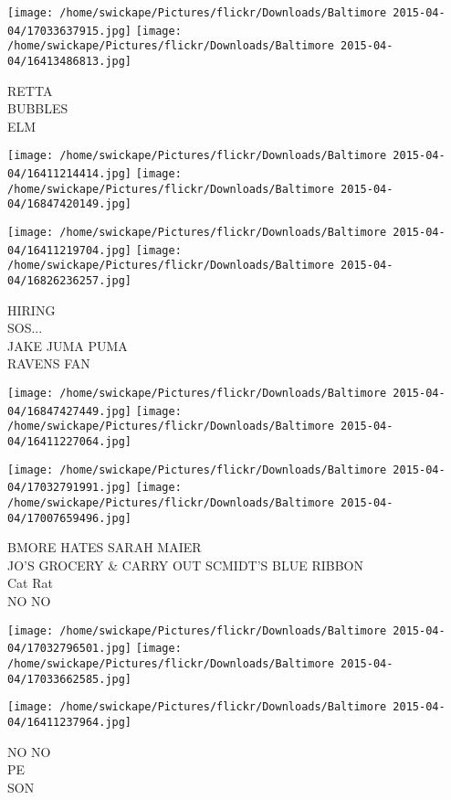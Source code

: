 \documentclass[10pt,letterpaper]{article}
\begin{document}
\vspace{0.25in}
\texttt{[image: /home/swickape/Pictures/flickr/Downloads/Baltimore 2015-04-04/17033637915.jpg]}
\texttt{[image: /home/swickape/Pictures/flickr/Downloads/Baltimore 2015-04-04/16413486813.jpg]}

RETTA\\
BUBBLES\\
ELM
\pagebreak

\texttt{[image: /home/swickape/Pictures/flickr/Downloads/Baltimore 2015-04-04/16411214414.jpg]}
\texttt{[image: /home/swickape/Pictures/flickr/Downloads/Baltimore 2015-04-04/16847420149.jpg]}

\texttt{[image: /home/swickape/Pictures/flickr/Downloads/Baltimore 2015-04-04/16411219704.jpg]}
\texttt{[image: /home/swickape/Pictures/flickr/Downloads/Baltimore 2015-04-04/16826236257.jpg]}

HIRING\\
SOS...\\
JAKE JUMA PUMA\\
RAVENS FAN
\pagebreak

\texttt{[image: /home/swickape/Pictures/flickr/Downloads/Baltimore 2015-04-04/16847427449.jpg]}
\texttt{[image: /home/swickape/Pictures/flickr/Downloads/Baltimore 2015-04-04/16411227064.jpg]}

\texttt{[image: /home/swickape/Pictures/flickr/Downloads/Baltimore 2015-04-04/17032791991.jpg]}
\texttt{[image: /home/swickape/Pictures/flickr/Downloads/Baltimore 2015-04-04/17007659496.jpg]}

BMORE HATES SARAH MAIER\\
JO'S GROCERY \& CARRY OUT SCMIDT'S BLUE RIBBON\\
Cat Rat\\
NO NO
\pagebreak

\texttt{[image: /home/swickape/Pictures/flickr/Downloads/Baltimore 2015-04-04/17032796501.jpg]}
\texttt{[image: /home/swickape/Pictures/flickr/Downloads/Baltimore 2015-04-04/17033662585.jpg]}

\vspace{0.25in}
\texttt{[image: /home/swickape/Pictures/flickr/Downloads/Baltimore 2015-04-04/16411237964.jpg]}

NO NO\\
PE\\
SON
\pagebreak
\end{document}
